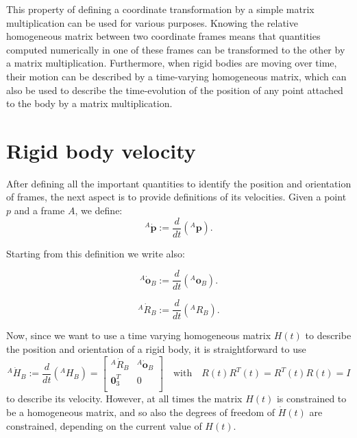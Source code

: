     This property of defining a coordinate transformation by a simple matrix multiplication can be used for various purposes. Knowing the relative homogeneous matrix between two coordinate frames means that quantities computed numerically in one of these frames can be transformed to the other by a matrix multiplication. Furthermore, when rigid bodies are moving over time, their motion can be described by a time-varying homogeneous matrix, which can also be used to describe the time-evolution of the position of any point attached to the body by a matrix multiplication.

    \section{Rigid body velocity}
    \label{sec:Rigid body velocity}

    After defining all the important quantities to identify the position and orientation of frames, the next aspect is to provide definitions of its velocities.
    Given a point $ {p}$ and a frame $A$, we define:
    \begin{equation}
    {}^{A}\dot{ \mathbf{p}} := \frac{d}{dt}({}^{A} \mathbf{p}).
    \end{equation}

    Starting from this definition we write also:

    \begin{equation}
    {}^{A}\dot{ \mathbf{o}}_B := \frac{d}{dt}({}^{A} \mathbf{o}_B).
    \end{equation}

    \begin{equation}
    {}^{A}\dot{ {R}}_B := \frac{d}{dt}({}^{A} {R}_B).
    \end{equation}

    Now, since we want to use a time varying homogeneous matrix $ {H}(t)$ to describe the position and orientation of a rigid body, it is straightforward to use 
    \begin{equation}
    {}^{A}\dot{ {H}}_B := \frac{d}{dt}({}^{A} {H}_B) = \begin{bmatrix}
    {}^{A}\dot{ {R}}_B & {}^{A}\dot{ \mathbf{o}}_B \\
     \mathbf{0}_{3}^{T} & 0 \\
    \end{bmatrix} \quad \text{with} \quad  {R}(t) {R}^{T}(t) =  {R}^{T}(t) {R}(t) =   {I}   \end{equation}
    to describe its velocity.
    However, at all times the matrix $ {H}(t)$ is constrained to be a homogeneous matrix, and so also the degrees of freedom of $\dot{ {H}}(t)$ are constrained, depending on the current value of $ {H}(t)$.


